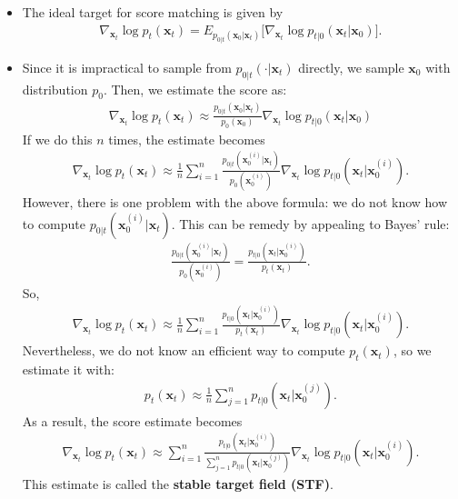 \documentclass[10pt]{article}
\newcommand{\ve}[1]{\mathbf{#1}}
\begin{document}
\begin{itemize}
  \item The ideal target for score matching is given by
  \begin{align*}
    \nabla_{\ve{x}_t} \log p_t(\ve{x}_t) = E_{p_{0|t}(\ve{x}_0|\ve{x}_t)} \big[ \nabla_{\ve{x}_t} \log p_{t|0} (\ve{x}_t|\ve{x}_0) \big].
  \end{align*}
  
  \item Since it is impractical to sample from $p_{0|t}(\cdot|\ve{x}_t)$ directly, we sample $\ve{x}_0$ with distribution $p_0$. Then, we estimate the score as:
  \begin{align*}
    \nabla_{\ve{x}_t} \log p_t(\ve{x}_t) \approx \frac{p_{0|t}(\ve{x}_0|\ve{x}_t)}{p_0(\ve{x}_0)} \nabla_{\ve{x}_t} \log p_{t|0} (\ve{x}_t|\ve{x}_0)
  \end{align*}
  If we do this $n$ times, the estimate becomes
  \begin{align*}
    \nabla_{\ve{x}_t} \log p_t(\ve{x}_t) \approx \frac{1}{n} \sum_{i=1}^n \frac{p_{0|t}(\ve{x}^{(i)}_{0}|\ve{x}_t)}{p_0(\ve{x}^{(i)}_0)} \nabla_{\ve{x}_t} \log p_{t|0} (\ve{x}_t|\ve{x}^{(i)}_{0}).
  \end{align*}
  However, there is one problem with the above formula: we do not know how to compute $p_{0|t}(\ve{x}^{(i)}_{0}|\ve{x}_t)$. This can be remedy by appealing to Bayes' rule:
  \begin{align*}
    \frac{p_{0|t}(\ve{x}^{(i)}_0|\ve{x}_t)}{p_0(\ve{x}_0^{(i)})} = \frac{p_{t|0}(\ve{x}_t|\ve{x}^{(i)}_0)}{p_t(\ve{x}_t)}.
  \end{align*}
  So,
  \begin{align*}
    \nabla_{\ve{x}_t} \log p_t(\ve{x}_t) \approx \frac{1}{n} \sum_{i=1}^n \frac{p_{t|0}(\ve{x}_t|\ve{x}^{(i)}_0)}{p_t(\ve{x}_t)} \nabla_{\ve{x}_t} \log p_{t|0} (\ve{x}_t|\ve{x}^{(i)}_{0}).
  \end{align*}
  Nevertheless, we do not know an efficient way to compute $p_t(\ve{x}_t)$, so we estimate it with:
  \begin{align*}
    p_t(\ve{x}_t) \approx \frac{1}{n} \sum_{j=1}^n p_{t|0}(\ve{x}_t|\ve{x}_0^{(j)}).
  \end{align*}
  As a result, the score estimate becomes
  \begin{align*}
    \nabla_{\ve{x}_t} \log p_t(\ve{x}_t) \approx \sum_{i=1}^n \frac{p_{t|0}(\ve{x}_t|\ve{x}^{(i)}_0)}{\sum_{j=1}^n p_{t|0}(\ve{x}_t|\ve{x}_0^{(j)})} \nabla_{\ve{x}_t} \log p_{t|0} (\ve{x}_t|\ve{x}^{(i)}_{0}).
  \end{align*}
  This estimate is called the {\bf stable target field (STF)}.


\end{itemize}
\end{document}
